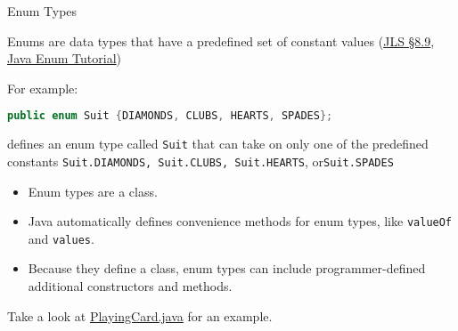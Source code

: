 \documentclass{beamer}
\newcommand{\code}{http://www.cc.gatech.edu/~simpkins/teaching/gatech/cs1331/code}
\begin{document}
\begin{frame}[fragile]{Enum Types}


Enums are data types that have a predefined set of constant values (\href{http://docs.oracle.com/javase/specs/jls/se7/html/jls-8.html#jls-8.9}{JLS \S 8.9}, \href{http://docs.oracle.com/javase/tutorial/java/javaOO/enum.html}{Java Enum Tutorial})

For example:
\begin{lstlisting}[language=Java]
  public enum Suit {DIAMONDS, CLUBS, HEARTS, SPADES};
\end{lstlisting}
defines an enum type called {\tt Suit} that can take on only one of the predefined constants {\tt Suit.DIAMONDS, Suit.CLUBS, Suit.HEARTS}, or{\tt Suit.SPADES}

\begin{itemize}
\item Enum types are a class.
\item Java automatically defines convenience methods for enum types, like {\tt valueOf} and {\tt values}.
\item Because they define a class, enum types can include programmer-defined additional constructors and methods.
\end{itemize}

Take a look at \href{\code/PlayingCard.java}{PlayingCard.java} for an example.

\end{frame}







\end{document}

